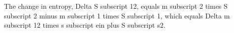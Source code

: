 The change in entropy, Delta S subscript 12, equals m subscript 2 times S subscript 2 minus m subscript 1 times S subscript 1, which equals Delta m subscript 12 times s subscript ein plus S subscript s2.